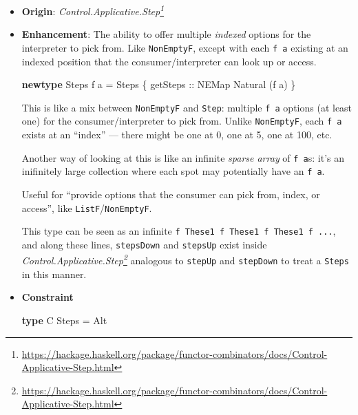 \documentclass[]{article}
\newenvironment{Shaded}{}{}
\newcommand{\DataTypeTok}[1]{\textcolor[rgb]{0.56,0.13,0.00}{#1}}
\newcommand{\KeywordTok}[1]{\textcolor[rgb]{0.00,0.44,0.13}{\textbf{#1}}}
\newcommand{\NormalTok}[1]{#1}
\newcommand{\OtherTok}[1]{\textcolor[rgb]{0.00,0.44,0.13}{#1}}
\renewcommand{\href}[2]{#2\footnote{\url{#1}}}
\begin{document}
\begin{itemize}
\item
  \textbf{Origin}:
  \emph{\href{https://hackage.haskell.org/package/functor-combinators/docs/Control-Applicative-Step.html}{Control.Applicative.Step}}
\item
  \textbf{Enhancement}: The ability to offer multiple \emph{indexed} options for
  the interpreter to pick from. Like \texttt{NonEmptyF}, except with each
  \texttt{f\ a} existing at an indexed position that the consumer/interpreter
  can look up or access.

\begin{Shaded}
\begin{Highlighting}[]
\KeywordTok{newtype} \DataTypeTok{Steps}\NormalTok{ f a }\OtherTok{=} \DataTypeTok{Steps}\NormalTok{ \{}\OtherTok{ getSteps ::} \DataTypeTok{NEMap} \DataTypeTok{Natural}\NormalTok{ (f a) \}}
\end{Highlighting}
\end{Shaded}

  This is like a mix between \texttt{NonEmptyF} and \texttt{Step}: multiple
  \texttt{f\ a} options (at least one) for the consumer/interpreter to pick
  from. Unlike \texttt{NonEmptyF}, each \texttt{f\ a} exists at an ``index'' ---
  there might be one at 0, one at 5, one at 100, etc.

  Another way of looking at this is like an infinite \emph{sparse array} of
  \texttt{f\ a}s: it's an inifinitely large collection where each spot may
  potentially have an \texttt{f\ a}.

  Useful for ``provide options that the consumer can pick from, index, or
  access'', like \texttt{ListF}/\texttt{NonEmptyF}.

  This type can be seen as an infinite
  \texttt{f\ \textasciigrave{}These1\textasciigrave{}\ f\ \textasciigrave{}These1\textasciigrave{}\ f\ \textasciigrave{}These1\textasciigrave{}\ f\ ...},
  and along these lines, \texttt{stepsDown} and \texttt{stepsUp} exist inside
  \emph{\href{https://hackage.haskell.org/package/functor-combinators/docs/Control-Applicative-Step.html}{Control.Applicative.Step}}
  analogous to \texttt{stepUp} and \texttt{stepDown} to treat a \texttt{Steps}
  in this manner.
\item
  \textbf{Constraint}

\begin{Shaded}
\begin{Highlighting}[]
\KeywordTok{type} \DataTypeTok{C} \DataTypeTok{Steps} \OtherTok{=} \DataTypeTok{Alt}


\end{Highlighting}
\end{Shaded}
\end{itemize}
\end{document}
